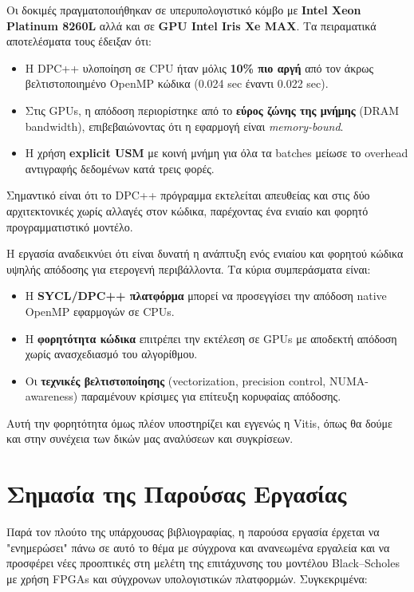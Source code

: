 Οι δοκιμές πραγματοποιήθηκαν σε υπερυπολογιστικό κόμβο με \textbf{Intel Xeon Platinum 8260L} αλλά και σε \textbf{GPU Intel Iris Xe MAX}.
Τα πειραματικά αποτελέσματα τους έδειξαν ότι:
\begin{itemize}
  \item Η DPC++ υλοποίηση σε CPU ήταν μόλις \textbf{10\% πιο αργή} από τον άκρως βελτιστοποιημένο OpenMP κώδικα (0.024 sec έναντι 0.022 sec).
  \item Στις GPUs, η απόδοση περιορίστηκε από το \textbf{εύρος ζώνης της μνήμης} (DRAM bandwidth), επιβεβαιώνοντας ότι η εφαρμογή είναι \textit{memory-bound}.
  \item Η χρήση \textbf{explicit USM} με κοινή μνήμη για όλα τα batches μείωσε το overhead αντιγραφής δεδομένων κατά τρεις φορές.
\end{itemize}
Σημαντικό είναι ότι το DPC++ πρόγραμμα εκτελείται απευθείας και στις δύο αρχιτεκτονικές χωρίς αλλαγές στον κώδικα, παρέχοντας ένα ενιαίο και φορητό προγραμματιστικό μοντέλο.
 
Η εργασία αναδεικνύει ότι είναι δυνατή η ανάπτυξη ενός ενιαίου και φορητού κώδικα υψηλής απόδοσης για ετερογενή περιβάλλοντα. Τα κύρια συμπεράσματα είναι:
\begin{itemize}
  \item Η \textbf{SYCL/DPC++ πλατφόρμα} μπορεί να προσεγγίσει την απόδοση native OpenMP εφαρμογών σε CPUs.
  \item Η \textbf{φορητότητα κώδικα} επιτρέπει την εκτέλεση σε GPUs με αποδεκτή απόδοση χωρίς ανασχεδιασμό του αλγορίθμου.
  \item Οι \textbf{τεχνικές βελτιστοποίησης} (vectorization, precision control, NUMA-awareness) παραμένουν κρίσιμες για επίτευξη κορυφαίας απόδοσης.
\end{itemize}

Αυτή την φορητότητα όμως πλέον υποστηρίζει και εγγενώς η Vitis, όπως θα δούμε και στην συνέχεια των δικών μας αναλύσεων και συγκρίσεων.

\section{Σημασία της Παρούσας Εργασίας}

Παρά τον πλούτο της υπάρχουσας βιβλιογραφίας, η παρούσα εργασία έρχεται να "ενημερώσει" πάνω σε αυτό το θέμα με σύγχρονα και ανανεωμένα εργαλεία 
και να προσφέρει νέες προοπτικές στη μελέτη της επιτάχυνσης του μοντέλου Black–Scholes με χρήση FPGAs και σύγχρονων υπολογιστικών πλατφορμών.
Συγκεκριμένα:


